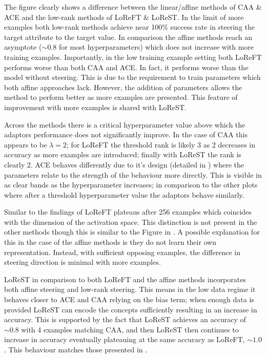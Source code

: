 The figure clearly shows a difference between the linear/affine methods of CAA \& ACE and the low-rank methods of LoReFT \& LoReST.
In the limit of more examples both low-rank methods achieve near 100\% success rate in steering the target attribute to the target value.
In comparison the affine methods reach an asymptote ($\sim 0.8$ for most hyperparameters) which does not increase with more training examples.
Importantly, in the low training example setting both LoReFT performs worse than both CAA and ACE.
In fact, it performs worse than the model without steering.
This is due to the requirement to train parameters which both affine approaches lack.
However, the addition of parameters allows the method to perform better as more examples are presented.
This feature of improvement with more examples is shared with LoReST.

Across the methods there is a critical hyperparameter value above which the adaptors performance does not significantly improve.
In the case of CAA this appears to be $\lambda=2$; for LoReFT the threshold rank is likely 3 as 2 decreases in accuracy as more examples are introduced; finally with LoReST the rank is clearly 2.
ACE behaves differently due to it's design (detailed in ) where the parameters relate to the strength of the behaviour more directly.
This is visible in  as clear bands as the hyperparameter increases; in comparison to the other plots where after a threshold hyperparameter value the adaptors behave similarly.

Similar to the findings of \citet{steering-clear} LoReFT plateaus after 256 examples which coincides with the dimension of the activation space.
This distinction is not present in the other methods though this is similar to the Figure in \citet{steering-clear}.
A possible explanation for this in the case of the affine methods is they do not learn their own representation.
Instead, with sufficient opposing examples, the difference in steering direction is minimal with more examples.

LoReST in comparison to both LoReFT and the affine methods incorporates both affine steering and low-rank steering.
This means in the low data regime it behaves closer to ACE and CAA relying on the bias term; when enough data is provided LoReST can encode the concepts sufficiently resulting in an increase in accuracy.
This is supported by the fact that LoReST achieves an accuracy of $\sim 0.8$ with 4 examples matching CAA, and then LoReST then continues to increase in accuracy eventually plateauing at the same accuracy as LoReFT, $\sim 1.0$.
This behaviour matches those presented in \citet{steering-clear}.

